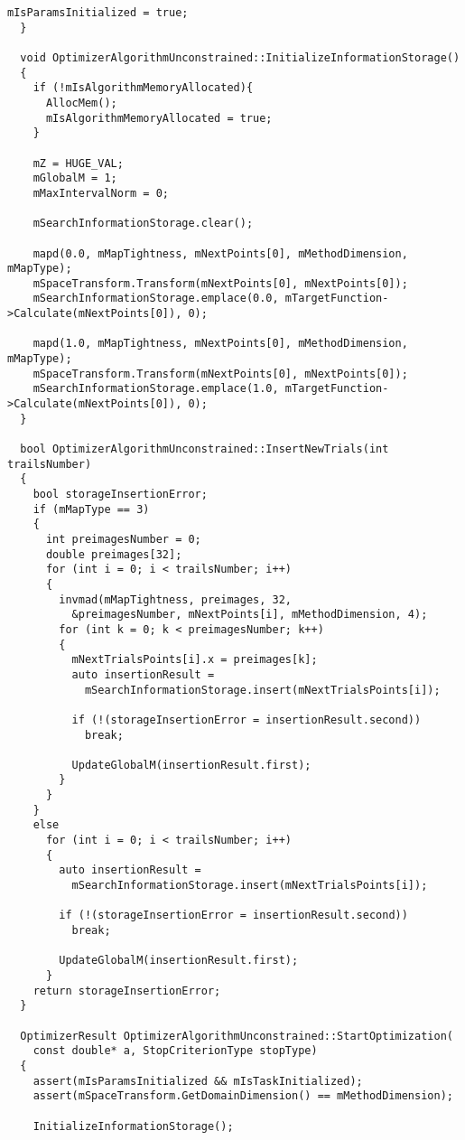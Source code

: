 \begin{lstlisting}[frame=single]
    mIsParamsInitialized = true;
  }

  void OptimizerAlgorithmUnconstrained::InitializeInformationStorage()
  {
    if (!mIsAlgorithmMemoryAllocated){
      AllocMem();
      mIsAlgorithmMemoryAllocated = true;
    }

    mZ = HUGE_VAL;
    mGlobalM = 1;
    mMaxIntervalNorm = 0;

    mSearchInformationStorage.clear();

    mapd(0.0, mMapTightness, mNextPoints[0], mMethodDimension, mMapType);
    mSpaceTransform.Transform(mNextPoints[0], mNextPoints[0]);
    mSearchInformationStorage.emplace(0.0, mTargetFunction->Calculate(mNextPoints[0]), 0);

    mapd(1.0, mMapTightness, mNextPoints[0], mMethodDimension, mMapType);
    mSpaceTransform.Transform(mNextPoints[0], mNextPoints[0]);
    mSearchInformationStorage.emplace(1.0, mTargetFunction->Calculate(mNextPoints[0]), 0);
  }

  bool OptimizerAlgorithmUnconstrained::InsertNewTrials(int trailsNumber)
  {
    bool storageInsertionError;
    if (mMapType == 3)
    {
      int preimagesNumber = 0;
      double preimages[32];
      for (int i = 0; i < trailsNumber; i++)
      {
        invmad(mMapTightness, preimages, 32,
          &preimagesNumber, mNextPoints[i], mMethodDimension, 4);
        for (int k = 0; k < preimagesNumber; k++)
        {
          mNextTrialsPoints[i].x = preimages[k];
          auto insertionResult =
            mSearchInformationStorage.insert(mNextTrialsPoints[i]);

          if (!(storageInsertionError = insertionResult.second))
            break;

          UpdateGlobalM(insertionResult.first);
        }
      }
    }
    else
      for (int i = 0; i < trailsNumber; i++)
      {
        auto insertionResult =
          mSearchInformationStorage.insert(mNextTrialsPoints[i]);

        if (!(storageInsertionError = insertionResult.second))
          break;

        UpdateGlobalM(insertionResult.first);
      }
    return storageInsertionError;
  }

  OptimizerResult OptimizerAlgorithmUnconstrained::StartOptimization(
    const double* a, StopCriterionType stopType)
  {
    assert(mIsParamsInitialized && mIsTaskInitialized);
    assert(mSpaceTransform.GetDomainDimension() == mMethodDimension);

    InitializeInformationStorage();


\end{lstlisting}
